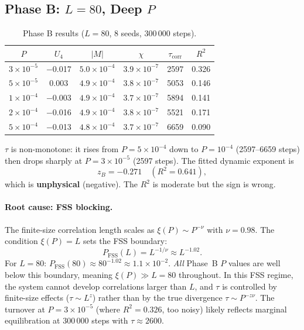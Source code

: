\documentclass[12pt,a4paper]{article}
\begin{document}
\subsection{Phase B: $L=80$, Deep $P$}

\begin{table}[h]
\centering
\caption{Phase B results ($L=80$, 8 seeds, 300\,000 steps).}
\label{tab:phaseB}
\begin{tabular}{cccccc}
\toprule
$P$ & $U_4$ & $|M|$ & $\chi$ & $\tau_\mathrm{corr}$ & $R^2$ \\
\midrule
$3\times10^{-5}$ & $-$0.017 & $5.0\times10^{-4}$ & $3.9\times10^{-7}$ & 2597  & 0.326 \\
$5\times10^{-5}$ & 0.003    & $4.9\times10^{-4}$ & $3.8\times10^{-7}$ & 5053  & 0.146 \\
$1\times10^{-4}$ & $-$0.003 & $4.9\times10^{-4}$ & $3.7\times10^{-7}$ & 5894  & 0.141 \\
$2\times10^{-4}$ & $-$0.016 & $4.9\times10^{-4}$ & $3.8\times10^{-7}$ & 5521  & 0.171 \\
$5\times10^{-4}$ & $-$0.013 & $4.8\times10^{-4}$ & $3.7\times10^{-7}$ & 6659  & 0.090 \\
\bottomrule
\end{tabular}
\end{table}

$\tau$ is non-monotone: it rises from $P=5\times10^{-4}$ down to $P=10^{-4}$ (2597--6659 steps)
then drops sharply at $P=3\times10^{-5}$ (2597 steps).  The fitted dynamic exponent is
\begin{equation}
  z_B = -0.271 \quad (R^2=0.641),
\end{equation}
which is \textbf{unphysical} (negative).  The $R^2$ is moderate but the sign is wrong.

\paragraph{Root cause: FSS blocking.}
The finite-size correlation length scales as $\xi(P) \sim P^{-\nu}$ with $\nu=0.98$.
The condition $\xi(P) = L$ sets the FSS boundary:
\begin{equation}
  P_\mathrm{FSS}(L) = L^{-1/\nu} \approx L^{-1.02}.
\end{equation}
For $L=80$: $P_\mathrm{FSS}(80) \approx 80^{-1.02} \approx 1.1\times10^{-2}$.
\emph{All} Phase~B $P$ values are well below this boundary, meaning $\xi(P) \gg L=80$
throughout.  In this FSS regime, the system cannot develop correlations larger than $L$, and
$\tau$ is controlled by finite-size effects ($\tau \sim L^z$) rather than by the true
divergence $\tau \sim P^{-z\nu}$.  The turnover at $P=3\times10^{-5}$ (where $R^2=0.326$,
too noisy) likely reflects marginal equilibration at 300\,000 steps with $\tau\approx 2600$.
\end{document}
